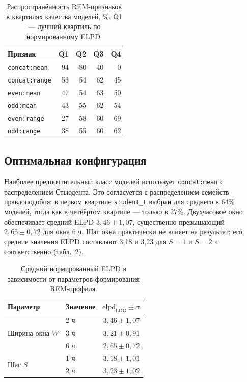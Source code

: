 \documentclass[14pt]{mmcs_article}
\newcommand{\elpd}{\mathrm{elpd}}
\begin{document}
\begin{table}[H]
\centering
\caption{Распространённость REM-признаков в квартилях качества моделей,
\%. Q1 --- лучший квартиль по нормированному ELPD.}
\label{tab:features}
\begin{tabular}{lrrrr}
\toprule
Признак & Q1 & Q2 & Q3 & Q4\\
\midrule
\texttt{concat:mean}  & 94 & 80 & 40 & 0\\
\texttt{concat:range} & 53 & 54 & 62 & 45\\
\texttt{even:mean}    & 47 & 54 & 63 & 50\\
\texttt{odd:mean}     & 43 & 55 & 62 & 54\\
\texttt{even:range}   & 27 & 58 & 60 & 69\\
\texttt{odd:range}    & 38 & 55 & 60 & 62\\
\bottomrule
\end{tabular}
\end{table}

\subsection{Оптимальная конфигурация}

Наиболее предпочтительный класс моделей использует
\texttt{concat:mean} с распределением Стьюдента. Это согласуется с
распределением семейств правдоподобия: в первом квартиле
\texttt{student\_t} выбран для среднего в 64\% моделей, тогда как в
четвёртом квартиле --- только в 27\%. Двухчасовое окно обеспечивает
средний ELPD $3{,}46\pm1{,}07$, существенно превышающий
$2{,}65\pm0{,}72$ для окна 6 ч. Шаг окна практически не влияет на
результат: его средние значения ELPD составляют 3,18 и 3,23 для
$S=1$ и $S=2$ ч соответственно (табл.~\ref{tab:window}).

\begin{table}[H]
\centering
\caption{Средний нормированный ELPD в зависимости от параметров
формирования REM-профиля.}
\label{tab:window}
\begin{tabular}{llr}
\toprule
Параметр & Значение & $\overline{\elpd}_{\mathrm{LOO}}\pm\sigma$\\
\midrule
\multirow{3}{*}{Ширина окна $W$} & 2 ч & $3{,}46\pm1{,}07$\\
 & 3 ч & $3{,}21\pm0{,}91$\\
 & 6 ч & $2{,}65\pm0{,}72$\\
\midrule
\multirow{2}{*}{Шаг $S$} & 1 ч & $3{,}18\pm1{,}01$\\
 & 2 ч & $3{,}23\pm1{,}02$\\
\bottomrule
\end{tabular}
\end{table}
\end{document}
